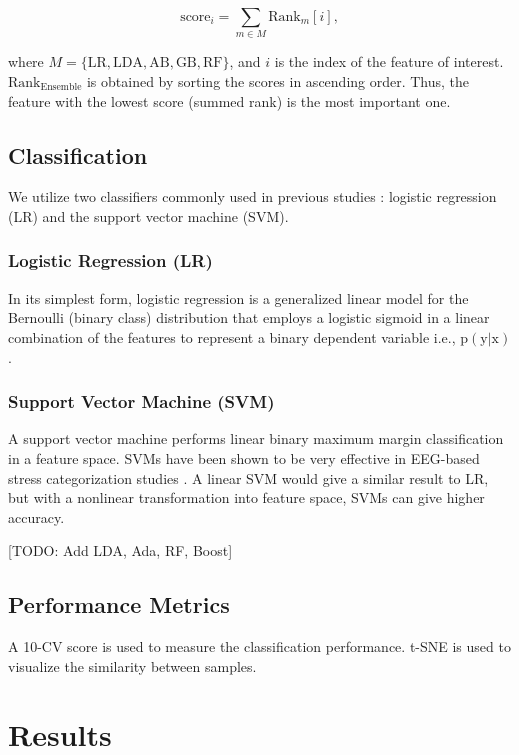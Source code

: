 \documentclass[pdflatex,sn-mathphys]{sn-jnl}%
\theoremstyle{thmstyleone}%
\theoremstyle{thmstyletwo}%
\theoremstyle{thmstylethree}%
\begin{document}
\begin{equation} \label{eq:rank_score}
   \text{score}_i = \sum_{m\in M} \text{Rank}_{m}[i],
\end{equation}

where $M = \{\text{LR}, \text{LDA}, \text{AB}, \text{GB}, \text{RF} \}$, and $i$ is the index of the feature of interest. $\text{Rank}_{\text{Ensemble}}$ is obtained by sorting the scores in ascending order. Thus, the feature with the lowest score (summed rank) is the most important one.

\subsection{Classification}\label{subsec4}
We utilize two classifiers commonly used in previous studies \cite{Alshargie-2018, Subhani-2017, Saeed2020, Kotsiantis2007}: logistic regression (LR) and the support vector machine (SVM).

\subsubsection{Logistic Regression (LR)}
In its simplest form, logistic regression is a generalized linear model for the Bernoulli (binary class) distribution that employs a logistic sigmoid in a linear combination of the features to represent a binary dependent variable i.e., $ \text{p} ( \text{y} \vert \text{x} ) $.

\subsubsection{Support Vector Machine (SVM)}
A support vector machine performs linear binary maximum margin classification in a feature space. SVMs have been shown to be very effective in EEG-based stress categorization studies \cite{Alshargie-2018, Subhani-2017}. A linear SVM would give a similar result to LR, but with a nonlinear transformation into feature space, SVMs can give higher accuracy.

[TODO: Add LDA, Ada, RF, Boost]

\subsection{Performance Metrics}\label{subsec5}
A 10-CV score is used to measure the classification performance. t-SNE is used to visualize the similarity between samples. 

\section{Results}\label{sec4}
\end{document}
